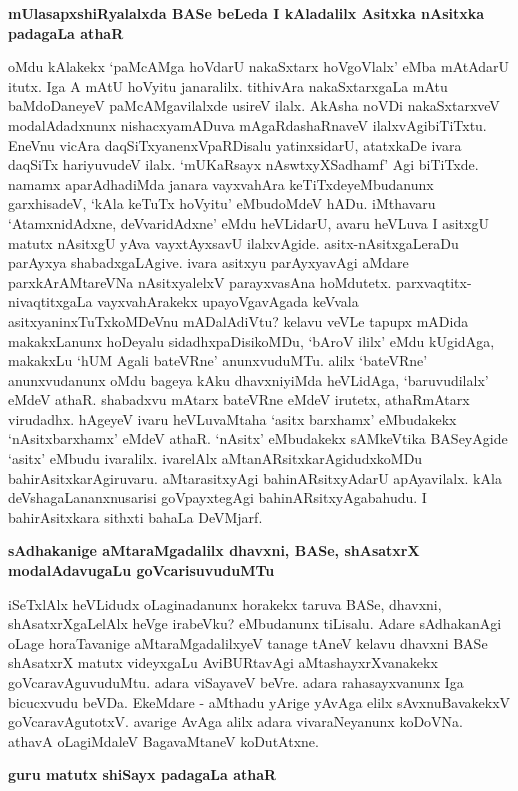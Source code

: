 {\bigskip
\noindent
{\large\bf mUlasapxshiRyalalxda BASe beLeda I kAladalilx Asitxka nAsitxka padagaLa athaR}}\label{page189}
\medskip

\noindent
oMdu kAlakekx `paMcAMga hoVdarU nakaSxtarx hoVgoVlalx' eMba mAtAdarU itutx. Iga A mAtU hoVyitu janaralilx. tithivAra nakaSxtarxgaLa mAtu baMdoDaneyeV paMcAMgavilalxde usireV ilalx. AkAsha noVDi nakaSxtarxveV modalAdadxnunx nishacxyamADuva mAgaRdashaRnaveV ilalxvAgibiTiTxtu. EneVnu vicAra daqSiTxyanenxVpaR\-Disalu yatinxsidarU, atatxkaDe ivara daqSiTx hariyuvudeV ilalx. `mUKaRsayx nAswtxyXSa\-dhamf'\label{189} Agi biTiTxde. namamx aparAdhadiMda janara vayxvahAra keTiTxdeyeMbudanunx garxhisadeV, `kAla keTuTx hoVyitu' eMbudoMdeV hADu. iMthavaru `AtamxnidAdxne, deVvaridAdxne' eMdu heVLidarU, avaru heVLuva I asitxgU matutx nAsitxgU yAva vayxtAyxsavU ilalxvAgide. asitx-nAsitxgaLeraDu parAyxya shabadx\-gaLAgive. ivara asitxyu parAyxyavAgi aMdare parxkArAMtareVNa nAsitxyalelxV parayxvasAna hoMdutetx. parx\-vaqtitx-nivaqtitxgaLa vayxvahArakekx upayoVgavAgada keVvala asitxyaninxTuTxkoMDeVnu mADalAdiVtu? kelavu veVLe tapupx mADida makakxLanunx hoDeyalu sidadhxpaDisikoMDu, `bAroV ililx' eMdu kUgidAga, makakxLu `hUM Agali bateVRne' anunxvuduMTu. alilx `bateVRne' anunxvudanunx oMdu bageya kAku dhavxniyiMda heVLidAga, `baruvudilalx' eMdeV athaR. shabadxvu mAtarx bateVRne eMdeV irutetx, athaRmAtarx virudadhx. hAgeyeV ivaru heVLuvaMtaha `asitx barxhamx' eMbudakekx `nAsitxbarxhamx' eMdeV athaR. `nAsitx' eMbudakekx sAMkeVtika BASeyAgide `asitx' eMbudu ivaralilx. ivarelAlx aMtanARsitxkarAgidudxkoMDu bahirAsitxka\-rAgiruvaru. aMtarasitxyAgi bahinARsitxyAdarU apAyavilalx. kAla deVshagaLananxnusarisi goVpayxte\-gAgi bahinARsitxyAgabahudu. I bahirAsitxkara sithxti bahaLa DeVMjarf.

{\bigskip
\noindent
{\large\bf sAdhakanige aMtaraMgadalilx dhavxni, BASe, shAsatxrX modalAdavugaLu goVcarisuvuduMTu}}\label{page189}
\medskip

\noindent
iSeTxlAlx heVLidudx oLaginadanunx horakekx taruva BASe, dhavxni, shAsatxrXgaLelAlx heVge irabeVku? eMbudanunx tiLisalu. Adare sAdhakanAgi oLage horaTavanige aMtaraMgadalilxyeV tanage tAneV kelavu dhavxni BASe shAsatxrX matutx videyxgaLu AviBURtavAgi aMtashayxrXvanakekx goVcaravAguvuduMtu. adara viSayaveV beVre. adara rahasayxvanunx Iga bicucxvudu beVDa. EkeMdare - aMthadu yArige yAvAga elilx sAvxnuBavakekxV goVcaravA\-gutotxV. avarige AvAga alilx adara vivaraNeyanunx koDoVNa. athavA oLagiMdaleV Baga\-vaMtaneV koDutAtxne.

{\bigskip
\noindent
{\large\bf guru matutx shiSayx padagaLa athaR}}\label{page190}
\medskip

